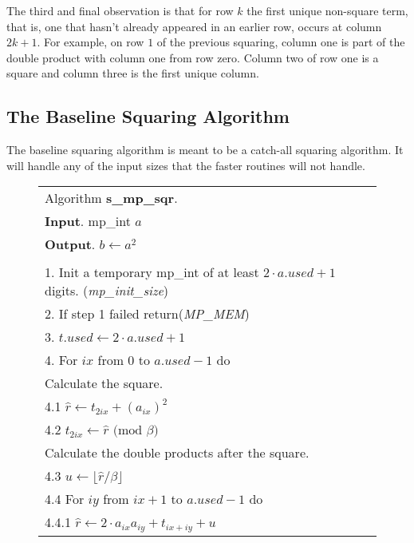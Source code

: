 \documentclass[b5paper]{book}
\begin{document}
The third and final observation is that for row $k$ the first unique non-square term, that is, one that hasn't already appeared in an earlier row, 
occurs at column $2k + 1$.  For example, on row $1$ of the previous squaring, column one is part of the double product with column one from row zero. 
Column two of row one is a square and column three is the first unique column.

\subsection{The Baseline Squaring Algorithm}
The baseline squaring algorithm is meant to be a catch-all squaring algorithm.  It will handle any of the input sizes that the faster routines
will not handle.  

\begin{figure}[!here]
\begin{small}
\begin{center}
\begin{tabular}{l}
\hline Algorithm \textbf{s\_mp\_sqr}. \\
\textbf{Input}.   mp\_int $a$ \\
\textbf{Output}.  $b \leftarrow a^2$ \\
\hline \\
1.  Init a temporary mp\_int of at least $2 \cdot a.used +1$ digits.  (\textit{mp\_init\_size}) \\
2.  If step 1 failed return(\textit{MP\_MEM}) \\
3.  $t.used \leftarrow 2 \cdot a.used + 1$ \\
4.  For $ix$ from 0 to $a.used - 1$ do \\
\hspace{3mm}Calculate the square. \\
\hspace{3mm}4.1  $\hat r \leftarrow t_{2ix} + \left (a_{ix} \right )^2$ \\
\hspace{3mm}4.2  $t_{2ix} \leftarrow \hat r \mbox{ (mod }\beta\mbox{)}$ \\
\hspace{3mm}Calculate the double products after the square. \\
\hspace{3mm}4.3  $u \leftarrow \lfloor \hat r / \beta \rfloor$ \\
\hspace{3mm}4.4  For $iy$ from $ix + 1$ to $a.used - 1$ do \\
\hspace{6mm}4.4.1  $\hat r \leftarrow 2 \cdot a_{ix}a_{iy} + t_{ix + iy} + u$ \\

\end{tabular}
\end{center}
\end{small}
\end{figure}
\end{document}
